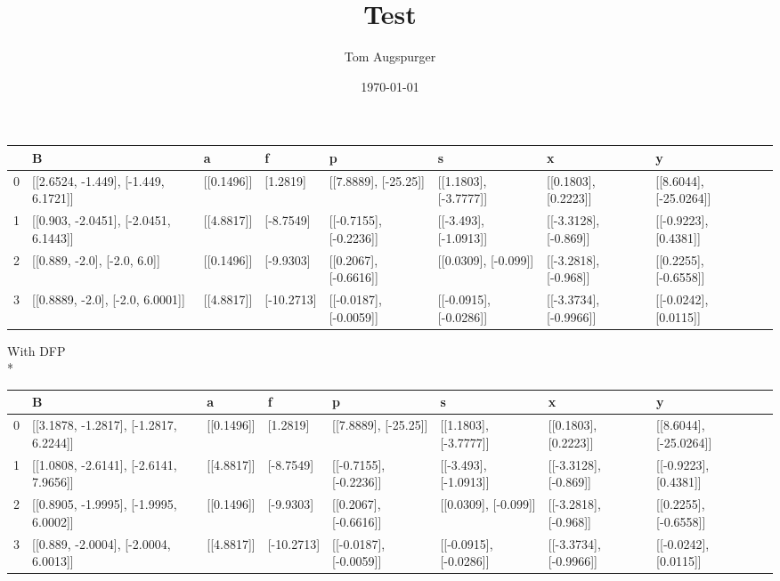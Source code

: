 \documentclass[10pt]{article}
\title{Test}
\author{Tom Augspurger}
\date{\today}
\begin{document}
\maketitle
\centerline{}
\begin{tabular}{*{9}{p{2.25cm}}}
\hline
{} &                                      B &           a &           f &                       p &                       s &                       x &                       y \\
\hline
0 &   [[2.6524, -1.449], [-1.449, 6.1721]] &  [[0.1496]] &    [1.2819] &    [[7.8889], [-25.25]] &   [[1.1803], [-3.7777]] &    [[0.1803], [0.2223]] &  [[8.6044], [-25.0264]] \\
1 &  [[0.903, -2.0451], [-2.0451, 6.1443]] &  [[4.8817]] &   [-8.7549] &  [[-0.7155], [-0.2236]] &   [[-3.493], [-1.0913]] &   [[-3.3128], [-0.869]] &   [[-0.9223], [0.4381]] \\
2 &           [[0.889, -2.0], [-2.0, 6.0]] &  [[0.1496]] &   [-9.9303] &   [[0.2067], [-0.6616]] &    [[0.0309], [-0.099]] &   [[-3.2818], [-0.968]] &   [[0.2255], [-0.6558]] \\
3 &       [[0.8889, -2.0], [-2.0, 6.0001]] &  [[4.8817]] &  [-10.2713] &  [[-0.0187], [-0.0059]] &  [[-0.0915], [-0.0286]] &  [[-3.3734], [-0.9966]] &   [[-0.0242], [0.0115]] \\
\hline
\end{tabular}

\newpage
With DFP\\*
\begin{tabular}{*{9}{p{2.25cm}}}
\hline
{} &                                       B &           a &           f &                       p &                       s &                       x &                       y \\
\hline
0 &  [[3.1878, -1.2817], [-1.2817, 6.2244]] &  [[0.1496]] &    [1.2819] &    [[7.8889], [-25.25]] &   [[1.1803], [-3.7777]] &    [[0.1803], [0.2223]] &  [[8.6044], [-25.0264]] \\
1 &  [[1.0808, -2.6141], [-2.6141, 7.9656]] &  [[4.8817]] &   [-8.7549] &  [[-0.7155], [-0.2236]] &   [[-3.493], [-1.0913]] &   [[-3.3128], [-0.869]] &   [[-0.9223], [0.4381]] \\
2 &  [[0.8905, -1.9995], [-1.9995, 6.0002]] &  [[0.1496]] &   [-9.9303] &   [[0.2067], [-0.6616]] &    [[0.0309], [-0.099]] &   [[-3.2818], [-0.968]] &   [[0.2255], [-0.6558]] \\
3 &   [[0.889, -2.0004], [-2.0004, 6.0013]] &  [[4.8817]] &  [-10.2713] &  [[-0.0187], [-0.0059]] &  [[-0.0915], [-0.0286]] &  [[-3.3734], [-0.9966]] &   [[-0.0242], [0.0115]] \\
\hline
\end{tabular}
\end{document}
